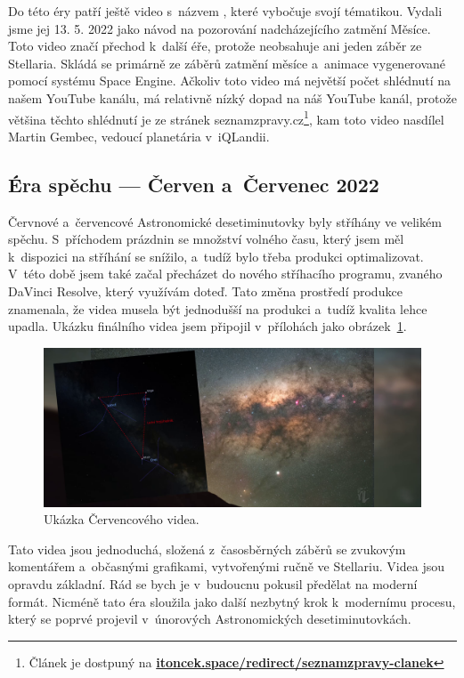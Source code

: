 \documentclass[12pt,a4paper,titlepage]{article}
\newcommand{\link}[2]{\href{#1}{\textcolor{link-color}{\textbf{#2}}}}%
\begin{document}
Do této éry patří ještě video s~názvem , které vybočuje svojí tématikou. Vydali jsme jej 13. 5. 2022 jako návod na pozorování nadcházejícího zatmění Měsíce. Toto video značí přechod k~další éře, protože neobsahuje ani jeden záběr ze Stellaria. Skládá se primárně ze záběrů zatmění měsíce a~animace vygenerované pomocí systému Space Engine. Ačkoliv toto video má největší počet shlédnutí na našem YouTube kanálu, má relativně nízký dopad na náš YouTube kanál, protože většina těchto shlédnutí je ze stránek seznam\-zpravy.cz\footnote{Článek je dostpuný na \link{https://mp.itoncek.space/redirect/seznamzpravy-clanek}{itoncek.space/redirect/seznamzpravy-clanek}}, kam toto video nasdílel Martin Gembec, vedoucí planetária v~iQLandii.
\subsection{Éra spěchu --- Červen a~Červenec 2022}
Červnové a~červencové Astronomické desetiminutovky byly stříhány ve velikém spěchu. S~příchodem prázdnin se množství volného času, který jsem měl k~dispozici na stříhání se snížilo, a~tudíž bylo třeba produkci optimalizovat. V~této době jsem také začal přecházet do nového stříhacího programu, zvaného DaVinci Resolve, který využívám doteď. Tato změna prostředí produkce znamenala, že videa musela být jednodušší na produkci a~tudíž kvalita lehce upadla. Ukázku finálního videa jsem připojil v~přílohách jako obrázek~\ref{img:cervenec}.

\begin{figure}[H]
	\centering
	\includegraphics[width=.85\textwidth]{cervenec.png}
	\caption{Ukázka Červencového videa.}\label{img:cervenec}
\end{figure}

Tato videa jsou jednoduchá, složená z~časosběrných záběrů se zvukovým komentářem a~občasnými grafikami, vytvořenými ručně ve Stellariu. Videa jsou opravdu základní. Rád se bych je v~budoucnu pokusil předělat na moderní formát. Nicméně tato éra sloužila jako další nezbytný krok k~modernímu procesu, který se poprvé projevil v~únorových Astronomických desetiminutovkách.
\end{document}
